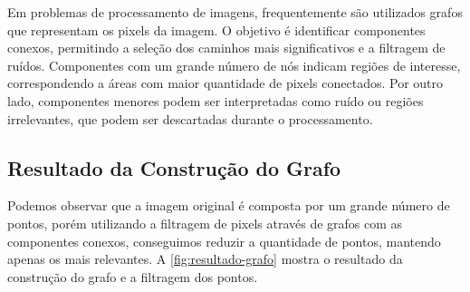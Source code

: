 Em problemas de processamento de imagens, frequentemente são utilizados grafos que representam os pixels da imagem. O objetivo é identificar componentes conexos, permitindo a seleção dos caminhos mais significativos e a filtragem de ruídos. Componentes com um grande número de nós indicam regiões de interesse, correspondendo a áreas com maior quantidade de pixels conectados. Por outro lado, componentes menores podem ser interpretadas como ruído ou regiões irrelevantes, que podem ser descartadas durante o processamento.

\subsection{Resultado da Construção do Grafo}
\label{sec:resultado-construcao-grafo}

Podemos observar que a imagem original é composta por um grande número de pontos, porém utilizando a filtragem de pixels através de grafos com as componentes conexos, conseguimos reduzir a quantidade de pontos, mantendo apenas os mais relevantes. A \autoref{fig:resultado-grafo} mostra o resultado da construção do grafo e a filtragem dos pontos.

